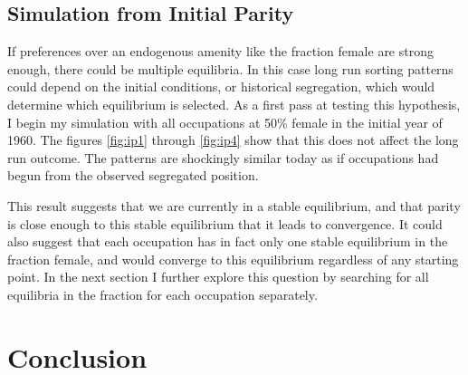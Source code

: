 \documentclass[12pt]{article}
\begin{document}



\subsection{Simulation from Initial Parity}
If preferences over an endogenous amenity like the fraction female are strong enough, there could be multiple equilibria. In this case long run sorting patterns could depend on the initial conditions, or historical segregation, which would determine which equilibrium is selected. As a first pass at testing this hypothesis, I begin my simulation with all occupations at 50\% female in the initial year of 1960. The figures \ref{fig:ip1} through \ref{fig:ip4} show that this does not affect the long run outcome. The patterns are shockingly similar today as if occupations had begun from the observed segregated position. 

This result suggests that we are currently in a stable equilibrium, and that parity is close enough to this stable equilibrium that it leads to convergence. It could also suggest that each occupation has in fact only one stable equilibrium in the fraction female, and would converge to this equilibrium regardless of any starting point. In the next section I further explore this question by searching for all equilibria in the fraction for each occupation separately.


\section{Conclusion}
\end{document}
